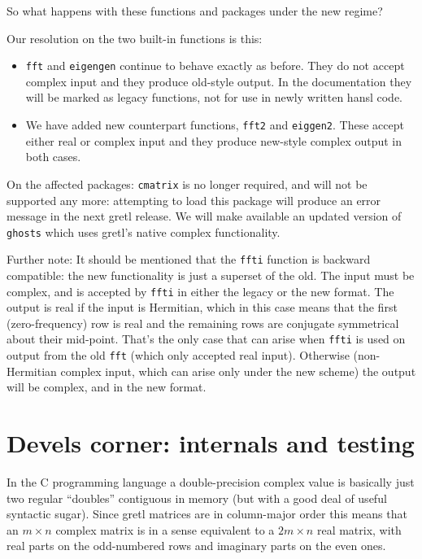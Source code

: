 \documentclass{article}
\begin{document}
So what happens with these functions and packages under the new
regime?

Our resolution on the two built-in functions is this:
\begin{itemize}
\item \texttt{fft} and \texttt{eigengen} continue to behave exactly as
  before. They do not accept complex input and they produce old-style
  output. In the documentation they will be marked as legacy
  functions, not for use in newly written hansl code.
\item We have added new counterpart functions, \texttt{fft2} and
  \texttt{eiggen2}. These accept either real or complex input and they
  produce new-style complex output in both cases.
\end{itemize}

On the affected packages: \texttt{cmatrix} is no longer required, and
will not be supported any more: attempting to load this package will
produce an error message in the next gretl release. We will make
available an updated version of \texttt{ghosts} which uses gretl's
native complex functionality.

Further note: It should be mentioned that the \texttt{ffti} function
is backward compatible: the new functionality is just a superset of
the old. The input must be complex, and is accepted by \texttt{ffti}
in either the legacy or the new format. The output is real if the
input is Hermitian, which in this case means that the first
(zero-frequency) row is real and the remaining rows are conjugate
symmetrical about their mid-point. That's the only case that can arise
when \texttt{ffti} is used on output from the old \texttt{fft} (which
only accepted real input).  Otherwise (non-Hermitian complex input,
which can arise only under the new scheme) the output will be complex,
and in the new format.

\section{Devels corner: internals and testing}
\label{sec:internals}

In the \textsf{C} programming language a double-precision complex
value is basically just two regular ``doubles'' contiguous in memory
(but with a good deal of useful syntactic sugar). Since gretl matrices
are in column-major order this means that an $m \times n$ complex
matrix is in a sense equivalent to a $2m \times n$ real matrix, with
real parts on the odd-numbered rows and imaginary parts on the even
ones.
\end{document}
